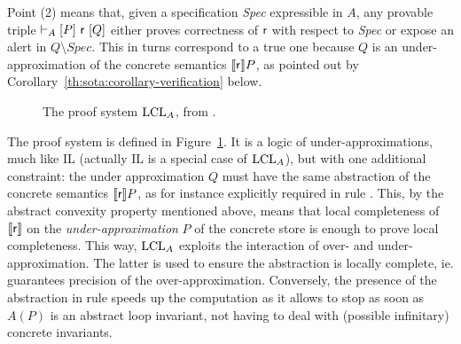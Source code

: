 Point (2) means that, given a specification \textit{Spec} expressible in $A$, any provable triple $\vdash_{A}\nobreak[P]~\mathsf{r}~[Q]$ either proves correctness of $\mathsf{r}$ with respect to \textit{Spec} or expose an alert in $Q \setminus \textit{Spec}$. This in turns correspond to a true one because $Q$ is an under-approximation of the concrete semantics $\llbracket\mathsf{r}\rrbracket P$, as pointed out by Corollary~\ref{th:sota:corollary-verification} below.

\begin{figure*}[t]
	\centering
	\begin{framed}
	\end{framed}
	\vspace{-1ex}
	\caption{The proof system $\text{LCL}_A$, from \cite{BGGR21}.}\label{fig:sota:lcla-rules}
\end{figure*}
The proof system is defined in Figure~\ref{fig:sota:lcla-rules}. It is a logic of under-approximations, much like IL (actually IL is a special case of $\text{LCL}_A$), but with one additional constraint: the under approximation $Q$ must have the same abstraction of the concrete semantics $\llbracket\mathsf{r}\rrbracket P$, as for instance explicitly required in rule . This, by the abstract convexity property mentioned above, means that local completeness of $\llbracket\mathsf{r}\rrbracket$ on the \emph{under-approximation} $P$ of the concrete store is enough to prove local completeness.
This way, $\text{LCL}_A$ exploits the interaction of over- and under-approximation. The latter is used to ensure the abstraction is locally complete, ie. guarantees precision of the over-approximation. Conversely, the presence of the abstraction in rule  speeds up the computation as it allows to stop as soon as $A(P)$ is an abstract loop invariant, not having to deal with (possible infinitary) concrete invariants.

